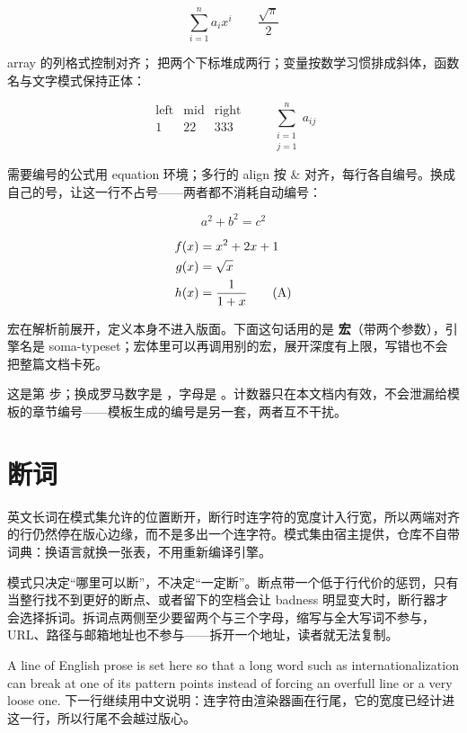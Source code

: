 \documentclass{article}
\newcommand{\engine}{\textsf{soma-typeset}}
\newcommand{\term}[2]{\textbf{#1}（#2）}
\newcounter{demo}
\begin{document}
\[
\sum_{i=1}^{n} a_i x^i \qquad \frac{\sqrt{\pi}}{2}
\]

array 的列格式控制对齐；\substack{} 把两个下标堆成两行；变量按数学习惯排成斜体，函数名与文字模式保持正体：

\[
\begin{array}{lcr}
\text{left} & \text{mid} & \text{right} \\
1 & 22 & 333
\end{array}
\qquad
\sum_{\substack{i=1\\j=1}}^{n} a_{ij}
\]

需要编号的公式用 equation 环境；多行的 align 按 \& 对齐，每行各自编号。\tag 换成自己的号，\notag 让这一行不占号——两者都不消耗自动编号：

\begin{equation}
a^2 + b^2 = c^2
\end{equation}

\begin{align}
f(x) &= x^2 + 2x + 1 \\
g(x) &= \sqrt{x} \notag \\
h(x) &= \frac{1}{1+x} \tag{A}
\end{align}

宏在解析前展开，定义本身不进入版面。下面这句话用的是 \term{宏}{带两个参数}，引擎名是 \engine{}；宏体里可以再调用别的宏，展开深度有上限，写错也不会把整篇文档卡死。


这是第  步；换成罗马数字是 ，字母是 。计数器只在本文档内有效，不会泄漏给模板的章节编号——模板生成的编号是另一套，两者互不干扰。

\section{断词}

英文长词在模式集允许的位置断开，断行时连字符的宽度计入行宽，所以两端对齐的行仍然停在版心边缘，而不是多出一个连字符。模式集由宿主提供，仓库不自带词典：换语言就换一张表，不用重新编译引擎。

模式只决定“哪里可以断”，不决定“一定断”。断点带一个低于行代价的惩罚，只有当整行找不到更好的断点、或者留下的空档会让 badness 明显变大时，断行器才会选择拆词。拆词点两侧至少要留两个与三个字母，缩写与全大写词不参与，URL、路径与邮箱地址也不参与——拆开一个地址，读者就无法复制。

A line of English prose is set here so that a long word such as internationalization can break at one of its pattern points instead of forcing an overfull line or a very loose one. 下一行继续用中文说明：连字符由渲染器画在行尾，它的宽度已经计进这一行，所以行尾不会越过版心。
\end{document}
